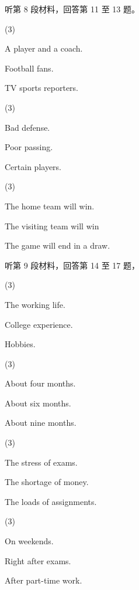 \documentclass{英语试卷}
\begin{document}
\par 听第 8 段材料，回答第 11 至 13 题。\par
{}
\begin{choices}(3)
  \item A player and a coach.
  \item Football fans.
  \item TV sports reporters.
\end{choices}
\begin{choices}(3)
  \item Bad defense.
  \item Poor passing.
  \item Certain players.
\end{choices}
\begin{choices}(3)
  \item The home team will win.
  \item The visiting team will win
  \item The game will end in a draw.
\end{choices}
\par 听第 9 段材料，回答第 14 至 17 题，\par
{}
\begin{choices}(3)
  \item The working life.
  \item College experience.
  \item Hobbies.
\end{choices}
\begin{choices}(3)
  \item About four months.
  \item About six months.
  \item About nine months.
\end{choices}
\begin{choices}(3)
  \item The stress of exams.
  \item The shortage of money.
  \item The loads of assignments.
\end{choices}
\begin{choices}(3)
  \item On weekends.
  \item Right after exams.
  \item After part-time work.
\end{choices}
\end{document}
